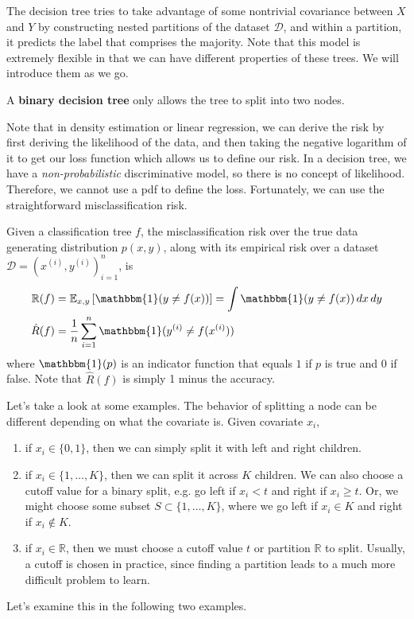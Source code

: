   The decision tree tries to take advantage of some nontrivial covariance between $X$ and $Y$ by constructing nested partitions of the dataset $\mathcal{D}$, and within a partition, it predicts the label that comprises the majority. Note that this model is extremely flexible in that we can have different properties of these trees. We will introduce them as we go. 

  \begin{definition}
    A \textbf{binary decision tree} only allows the tree to split into two nodes. 
  \end{definition} 

  Note that in density estimation or linear regression, we can derive the risk by first deriving the likelihood of the data, and then taking the negative logarithm of it to get our loss function which allows us to define our risk. In a decision tree, we have a \textit{non-probabilistic} discriminative model, so there is no concept of likelihood. Therefore, we cannot use a pdf to define the loss. Fortunately, we can use the straightforward misclassification risk. 

  \begin{theorem}
    Given a classification tree $f$, the misclassification risk over the true data generating distribution $p(x, y)$, along with its empirical risk over a dataset $\mathcal{D} = (x^{(i)}, y^{(i)})_{i=1}^n$, is 
    \begin{align}
      \mathbb{R}(f) & = \mathbb{E}_{x, y} \left[ \mathbbm{1} (y \neq f(x))\right] = \int \mathbbm{1} (y \neq f(x)) \, dx \,dy \\ 
      \hat{R}(f) & = \frac{1}{n} \sum_{i=1}^n \mathbbm{1} (y^{(i)} \neq f(x^{(i)}))
    \end{align}
    where $\mathbbm{1}(p)$ is an indicator function that equals $1$ if $p$ is true and $0$ if false. Note that $\hat{R}(f)$ is simply 1 minus the accuracy. 
  \end{theorem} 

  Let's take a look at some examples. The behavior of splitting a node can be different depending on what the covariate is. Given covariate $x_i$, 
  \begin{enumerate}
    \item if $x_i \in \{0, 1\}$, then we can simply split it with left and right children. 
    \item if $x_i \in \{1, \ldots, K\}$, then we can split it across $K$ children. We can also choose a cutoff value for a binary split, e.g. go left if $x_i < t$ and right if $x_i \geq t$. Or, we might choose some subset $S \subset \{1, \ldots, K\}$, where we go left if $x_i \in K$ and right if $x_i \not\in K$. 
    \item if $x_i \in \mathbb{R}$, then we must choose a cutoff value $t$ or partition $\mathbb{R}$ to split. Usually, a cutoff is chosen in practice, since finding a partition leads to a much more difficult problem to learn. 
  \end{enumerate}
  Let's examine this in the following two examples. 

